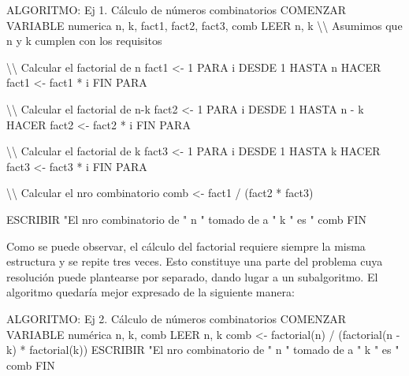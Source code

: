\documentclass[
]{book}
\newenvironment{Shaded}{\begin{snugshade}}{\end{snugshade}}
\newcommand{\NormalTok}[1]{#1}
\begin{document}
\begin{Shaded}
\begin{Highlighting}[]
\NormalTok{ALGORITMO: Ej 1. Cálculo de números combinatorios}
\NormalTok{COMENZAR}
\NormalTok{    VARIABLE numerica n, k, fact1, fact2, fact3, comb}
\NormalTok{    LEER n, k \textbackslash{}\textbackslash{} Asumimos que n y k cumplen con los requisitos}

\NormalTok{    \textbackslash{}\textbackslash{} Calcular el factorial de n}
\NormalTok{    fact1 \textless{}{-} 1}
\NormalTok{    PARA i DESDE 1 HASTA n HACER}
\NormalTok{        fact1 \textless{}{-} fact1 * i}
\NormalTok{    FIN PARA}

\NormalTok{    \textbackslash{}\textbackslash{} Calcular el factorial de n{-}k}
\NormalTok{    fact2 \textless{}{-} 1}
\NormalTok{    PARA i DESDE 1 HASTA n {-} k HACER}
\NormalTok{        fact2 \textless{}{-} fact2 * i}
\NormalTok{    FIN PARA}

\NormalTok{    \textbackslash{}\textbackslash{} Calcular el factorial de k}
\NormalTok{    fact3 \textless{}{-} 1}
\NormalTok{    PARA i DESDE 1 HASTA k HACER}
\NormalTok{        fact3 \textless{}{-} fact3 * i}
\NormalTok{    FIN PARA}

\NormalTok{    \textbackslash{}\textbackslash{} Calcular el nro combinatorio}
\NormalTok{    comb \textless{}{-} fact1 / (fact2 * fact3)}

\NormalTok{    ESCRIBIR "El nro combinatorio de " n " tomado de a " k " es " comb}
\NormalTok{FIN}
\end{Highlighting}
\end{Shaded}

Como se puede observar, el cálculo del factorial requiere siempre la misma estructura y se repite tres veces. Esto constituye una parte del problema cuya resolución puede plantearse por separado, dando lugar a un subalgoritmo. El algoritmo quedaría mejor expresado de la siguiente manera:

\begin{Shaded}
\begin{Highlighting}[]
\NormalTok{ALGORITMO: Ej 2. Cálculo de números combinatorios}
\NormalTok{COMENZAR}
\NormalTok{    VARIABLE numérica n, k, comb}
\NormalTok{    LEER n, k }
\NormalTok{    comb \textless{}{-} factorial(n) / (factorial(n {-} k) * factorial(k))}
\NormalTok{    ESCRIBIR "El nro combinatorio de " n " tomado de a " k " es " comb}
\NormalTok{FIN}
\end{Highlighting}
\end{Shaded}
\end{document}
